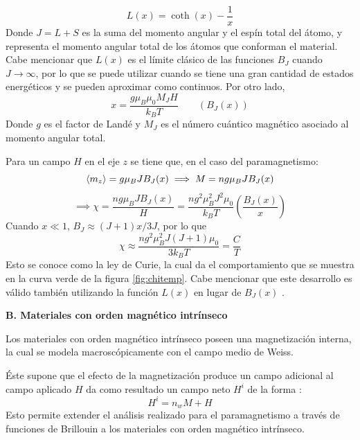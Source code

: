 \documentclass[../main.tex]{subfiles}
\begin{document}
\begin{itemize}
\begin{equation}
        L(x)=\coth(x)-\dfrac{1}{x}
        \label{eq:Langevin}
    \end{equation}
    Donde $J=L+S$ es la suma del momento angular y el espín total del átomo, y representa el momento angular total de los átomos que conforman el material. Cabe mencionar que $L(x)$ es el límite clásico de las funciones $B_J$ cuando $J\rightarrow\infty$, por lo que se puede utilizar cuando se tiene una gran cantidad de estados energéticos y se pueden aproximar como continuos. Por otro lado,
    \begin{equation}
        x=\dfrac{g\mu_B\mu_0M_JH}{k_BT}\qquad (B_J(x))
        \label{eq:xBrillouin}
    \end{equation}
    Donde $g$ es el factor de Landé y $M_J$ es el número cuántico magnético asociado al momento angular total.

    Para un campo $H$ en el eje $z$ se tiene que, en el caso del paramagnetismo:
    \begin{equation}
            \langle m_z \rangle=g\mu_BJB_J(x) \implies M=ng\mu_B J B_J(x)
        \label{eq:momentozetaparam}
    \end{equation}
    \begin{equation}
        \implies \chi=\dfrac{ng\mu_B J B_J(x)}{H}=\dfrac{n g^2 \mu_B^2 J^2 \mu_0}{k_BT}\left(\dfrac{B_J(x)}{x}\right)
        \label{eq:chiparam}
    \end{equation}
    Cuando $x\ll1$, $B_J\approx(J+1)x/3J$, por lo que
    \begin{equation}
        \chi\approx\dfrac{ng^2\mu_B^2J(J+1)\mu_0}{3k_BT}=\dfrac{C}{T}
        \label{eq:leycurie}
    \end{equation}
    Esto se conoce como la ley de Curie, la cual da el comportamiento que se muestra en la curva verde de la figura \ref{fig:chitemp}. Cabe mencionar que este desarrollo es válido también utilizando la función $L(x)$ en lugar de $B_J(x)$ \cite{coey2010magnetism}.
\end{itemize}
\textbf{B. Materiales con orden magnético intrínseco}

Los materiales con orden magnético intrínseco poseen una magnetización interna, la cual se modela macroscópicamente con el campo medio de Weiss.

Éste supone que el efecto de la magnetización produce un campo adicional al campo aplicado $H$ da como resultado un campo neto $H^i$ de la forma \cite{coey2010magnetism}:
\begin{equation}
    H^i=n_wM+H
    \label{eq:Weiss}
\end{equation}
Esto permite extender el análisis realizado para el paramagnetismo a través de funciones de Brillouin a los materiales con orden magnético intrínseco.
\end{document}
